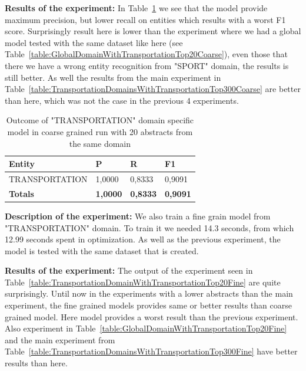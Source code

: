 \documentclass[thesis=M,english]{FITthesis}[2018/05/30]
\begin{document}
\textbf{Results of the experiment:} In Table~\ref{table:TransportationDomainWithTransportationTop20Coarse} we see that the model provide maximum precision, but lower recall on entities which results with a worst F1 score. Surprisingly result here is lower than the experiment where we had a global model tested with the same dataset like here (see Table~\ref{table:GlobalDomainWithTransportationTop20Coarse}), even those that there we have a wrong entity recognition from "SPORT" domain, the results is still better. As well the results from the main experiment in Table~\ref{table:TransportationDomainsWithTransportationTop300Coarse} are better than here, which was not the case in the previous 4 experiments.

	\begin{table}[H]\centering
		\begin{tabular}{|l|l|l|l|}
			\hline {\textbf{Entity}} & {\textbf{P}} & {\textbf{R}} & {\textbf{F1}}\\\hline
				TRANSPORTATION & 1,0000 & 0,8333 & 0,9091\\\hline
				\textbf{Totals} & \textbf{1,0000} & \textbf{0,8333} & \textbf{0,9091}\\\hline
		\end{tabular}
		\caption{Outcome of "TRANSPORTATION" domain specific model in coarse grained run with 20 abstracts from the same domain \label{table:TransportationDomainWithTransportationTop20Coarse}}			
	\end{table}	
	
\textbf{Description of the experiment:} We also train a fine grain model from "TRANSPORTATION" domain. To train it we needed 14.3 seconds, from which 12.99 seconds spent in optimization. As well as the previous experiment, the model is tested with the same dataset that is created.

\textbf{Results of the experiment:}	The output of the experiment seen in Table~\ref{table:TransportationDomainWithTransportationTop20Fine} are quite surprisingly. Until now in the experiments with a lower abstracts than the main experiment, the fine grained models provides same or better results than coarse grained model. Here model provides a worst result than the previous experiment. Also experiment in Table~\ref{table:GlobalDomainWithTransportationTop20Fine} and the main experiment from Table~\ref{table:TransportationDomainsWithTransportationTop300Fine} have better results than here.
\end{document}
